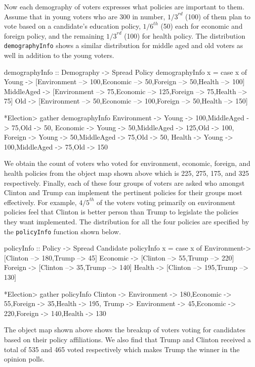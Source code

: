 \documentclass{jfp}
\newcommand{\prog}[1]{\texttt{#1}}
\begin{document}
Now each demography of voters expresses what policies are important to them. Assume that in young voters who are 300 in number, ${1/3}^{rd}$ (100) of them plan to vote based on a candidate's education policy, ${1/6}^{th}$ (50) each for economic and foreign policy, and the remaining ${1/3}^{rd}$ (100) for health policy. The distribution \prog{demographyInfo} shows a similar distribution for middle aged and old voters as well in addition to the young voters.
\begin{haskellcode}
demographyInfo :: Demography -> Spread Policy
demographyInfo x 
    = case x of
        Young -> [Environment --> 100,Economic --> 50,Foreign --> 50,Health --> 100]
        MiddleAged -> [Environment --> 75,Economic --> 125,Foreign --> 75,Health --> 75]
        Old -> [Environment --> 50,Economic --> 100,Foreign --> 50,Health --> 150]

*Election> gather demographyInfo
{Environment -> {Young -> 100,MiddleAged -> 75,Old -> 50},
 Economic -> {Young -> 50,MiddleAged -> 125,Old -> 100},
 Foreign -> {Young -> 50,MiddleAged -> 75,Old -> 50},
 Health -> {Young -> 100,MiddleAged -> 75,Old -> 150}}
\end{haskellcode}
We obtain the count of voters who voted for environment, economic, foreign, and health policies from the object map shown above which is 225, 275, 175, and 325 respectively. Finally, each of these four groups of voters are asked who amongst Clinton and Trump can implement the pertinent policies for their groups most effectively. For example, ${4/5}^{th}$ of the voters voting primarily on environment policies feel that Clinton is better person than Trump to legislate the policies they want implemented. The distribution for all the four policies are specified by the \prog{policyInfo} function shown below. 
\begin{haskellcode}
policyInfo :: Policy -> Spread Candidate
policyInfo x = case x of Environment-> [Clinton --> 180,Trump --> 45] 
                         Economic -> [Clinton --> 55,Trump --> 220]
                         Foreign  -> [Clinton --> 35,Trump --> 140]  
                         Health   -> [Clinton --> 195,Trump --> 130]
                         
*Election> gather policyInfo
{Clinton -> {Environment -> 180,Economic -> 55,Foreign -> 35,Health -> 195},
 Trump ->   {Environment -> 45,Economic -> 220,Foreign -> 140,Health -> 130}}
\end{haskellcode}
The object map shown above shows the breakup of voters voting for candidates based on their policy affiliations. We also find that Trump and Clinton received a total of 535 and 465 voted respectively which makes Trump the winner in the opinion polls. 
\end{document}
